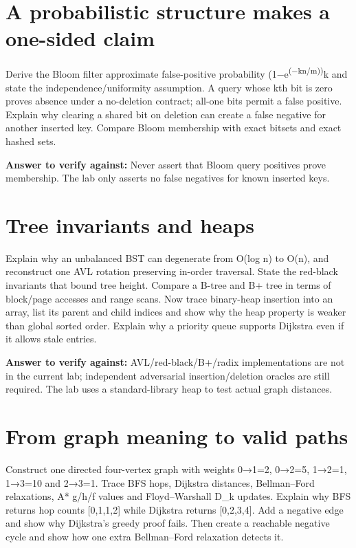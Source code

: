\section{A probabilistic structure makes a one-sided claim}\label{appendix-8a046b38375e-a-probabilistic-structure-makes-a-one-sided-claim}

Derive the Bloom filter approximate false-positive probability (1−e\textsuperscript{(−kn/m))}k and state the independence/uniformity assumption. A query whose kth bit is zero proves absence under a no-deletion contract; all-one bits permit a false positive. Explain why clearing a shared bit on deletion can create a false negative for another inserted key. Compare Bloom membership with exact bitsets and exact hashed sets.

\textbf{Answer to verify against:} Never assert that Bloom query positives prove membership. The lab only asserts no false negatives for known inserted keys.

\section{Tree invariants and heaps}\label{appendix-8a046b38375e-tree-invariants-and-heaps}

Explain why an unbalanced BST can degenerate from O(log n) to O(n), and reconstruct one AVL rotation preserving in-order traversal. State the red-black invariants that bound tree height. Compare a B-tree and B+ tree in terms of block/page accesses and range scans. Now trace binary-heap insertion into an array, list its parent and child indices and show why the heap property is weaker than global sorted order. Explain why a priority queue supports Dijkstra even if it allows stale entries.

\textbf{Answer to verify against:} AVL/red-black/B+/radix implementations are not in the current lab; independent adversarial insertion/deletion oracles are still required. The lab uses a standard-library heap to test actual graph distances.

\section{From graph meaning to valid paths}\label{appendix-8a046b38375e-from-graph-meaning-to-valid-paths}

Construct one directed four-vertex graph with weights 0→1=2, 0→2=5, 1→2=1, 1→3=10 and 2→3=1. Trace BFS hops, Dijkstra distances, Bellman--Ford relaxations, A* g/h/f values and Floyd--Warshall D\_k updates. Explain why BFS returns hop counts {[}0,1,1,2{]} while Dijkstra returns {[}0,2,3,4{]}. Add a negative edge and show why Dijkstra's greedy proof fails. Then create a reachable negative cycle and show how one extra Bellman--Ford relaxation detects it.

